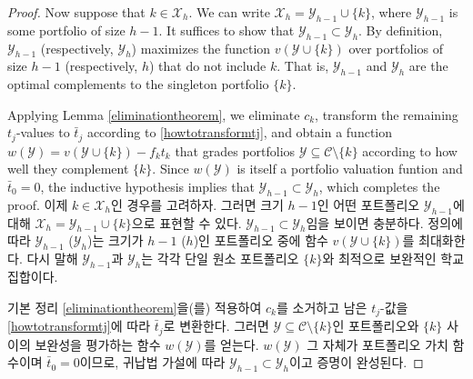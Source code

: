 \documentclass[11pt]{article} %
\theoremstyle{definition}
\theoremstyle{definition}
\begin{document}
\begin{proof}
\ifen Now suppose that $k \in \mathcal{X}_h$. We can write $\mathcal{X}_h = \mathcal{Y}_{h-1} \cup \{k\}$, where $ \mathcal{Y}_{h-1}$ is some portfolio of size $h-1$. It suffices to show that $ \mathcal{Y}_{h-1} \subset \mathcal{Y}_h$. By definition, $\mathcal{Y}_{h-1}$ (respectively, $\mathcal{Y}_{h}$) maximizes the function $v(\mathcal{Y}\cup\{k\})$ over portfolios of size $h-1$ (respectively, $h$) that do not include $k$. That is, $\mathcal{Y}_{h-1}$ and $\mathcal{Y}_h$ are the optimal complements to the singleton portfolio $\{k\}$.

Applying Lemma \ref{eliminationtheorem}, we eliminate $c_k$, transform the remaining $t_j$-values to $\bar t_j$ according to \eqref{howtotransformtj}, and obtain a function $w(\mathcal{Y}) = v(\mathcal{Y} \cup \{k\}) - f_k t_k$ that grades portfolios $\mathcal{Y} \subseteq \mathcal{C} \setminus \{k\}$ according to how well they complement $\{k\}$. Since $w(\mathcal{Y})$ is itself a portfolio valuation funtion and $\bar t_0 = 0$, the inductive hypothesis implies that $\mathcal{Y}_{h-1} \subset \mathcal{Y}_h$, which completes the proof.
\else 이제 $k \in \mathcal{X}_h$인 경우를 고려하자. 그러면 크기 $h-1$인 어떤 포트폴리오 $\mathcal{Y}_{h-1}$에 대해 $\mathcal{X}_h = \mathcal{Y}_{h-1} \cup \{k\}$으로 표현할 수 있다. $\mathcal{Y}_{h-1} \subset \mathcal{Y}_h$임을 보이면 충분하다. 정의에 따라 $\mathcal{Y}_{h-1}$ ($\mathcal{Y}_{h}$)는 크기가 $h-1$ ($h$)인 포트폴리오 중에 함수 $v(\mathcal{Y}\cup\{k\})$를 최대화한다. 다시 말해 $\mathcal{Y}_{h-1}$과 $\mathcal{Y}_h$는 각각 단일 원소 포트폴리오 $\{k\}$와 최적으로 보완적인 학교 집합이다. 

기본 정리 \ref{eliminationtheorem}을(를) 적용하여 $c_k$를 소거하고 남은 $t_j$-값을 \eqref{howtotransformtj}에 따라 $\bar t_j$로 변환한다. 그러면 $\mathcal{Y} \subseteq \mathcal{C} \setminus \{k\}$인 포트폴리오와 $\{k\}$ 사이의 보완성을 평가하는 함수 $w(\mathcal{Y})$를 얻는다. $w(\mathcal{Y})$ 그 자체가 포트폴리오 가치 함수이며 $\bar t_0 = 0$이므로, 귀납법 가설에 따라 $\mathcal{Y}_{h-1} \subset \mathcal{Y}_h$이고 증명이 완성된다.\fi
\end{proof}
\end{document}
